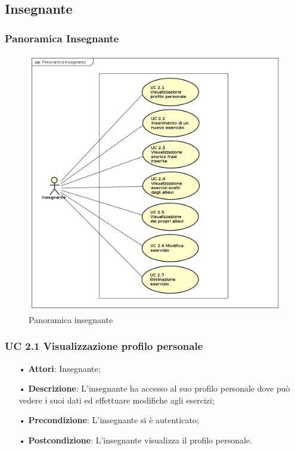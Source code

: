
\subsection{Insegnante}

\subsubsection{Panoramica Insegnante}

\begin{figure}[H]
\centering
\includegraphics[width=14cm]{img/PanoramicaInsegnanti.png} 
\caption{Panoramica insegnante}
\end{figure}

\subsubsection{UC 2.1 Visualizzazione profilo personale}


\begin{itemize}
	\item[•] \textbf{Attori}: Insegnante;
	\item[•] \textbf{Descrizione}: L’insegnante ha accesso al suo profilo personale dove può vedere i suoi dati ed effettuare modifiche agli esercizi;

	\item[•] \textbf{Precondizione}: L'insegnante si è autenticato;

	\item[•] \textbf{Postcondizione}: L'insegnante visualizza il profilo personale.

\end{itemize}


